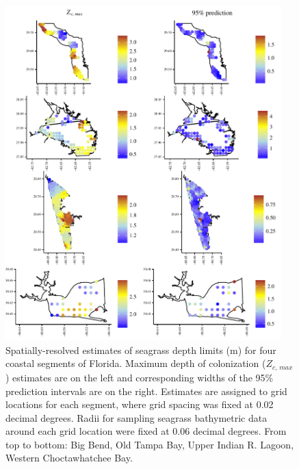\documentclass[letterpaper,12pt,oneside]{article}\usepackage[]{graphicx}\usepackage[]{color}
\begin{document}
\begin{figure}
\centering
\includegraphics[width = 0.95\textwidth]{figs/all_ests.pdf}
\caption{Spatially-resolved estimates of seagrass depth limits (m) for four coastal segments of Florida. Maximum depth of colonization ($Z_{c,\,max}$) estimates are on the left and corresponding widths of the 95\% prediction intervals are on the right.  Estimates are assigned to grid locations for each segment, where grid spacing was fixed at 0.02 decimal degrees.  Radii for sampling seagrass bathymetric data around each grid location were fixed at 0.06 decimal degrees. From top to bottom: Big Bend, Old Tampa Bay, Upper Indian R. Lagoon, Western Choctawhatchee Bay.}
\label{fig:all_ests}
\end{figure}

\end{document}
